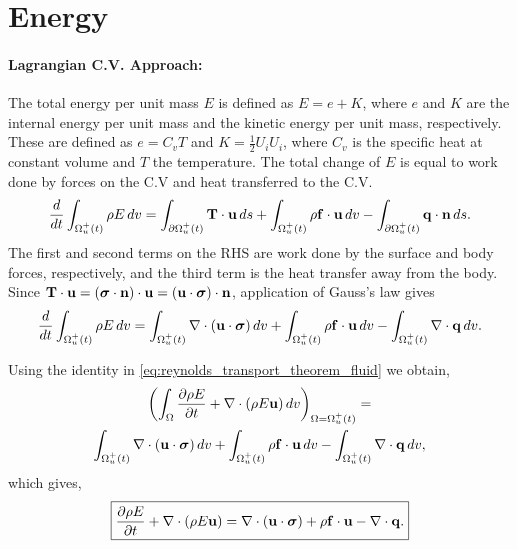 \documentclass[oneside,a4paper,11pt]{report}
\begin{document}
\section{Energy}

\paragraph{Lagrangian C.V. Approach:}
The total energy per unit mass $E$ is defined as $E = e + K$, where $e$ and $K$ are the internal energy per unit mass and the kinetic energy per unit mass, respectively. These are defined as $e = C_vT$ and $K = \frac{1}{2} U_i U_i$, where $C_v$ is the specific heat at constant volume and $T$ the temperature. The total change of $E$ is equal to work done by forces on the C.V and heat transferred to the C.V.
\begin{equation}
\frac{d}{dt}\int_{\Omega^+_u(t)} \rho E\,dv = \int_{\partial \Omega^+_u(t)} \mathbf{T} \cdot \mathbf{u} \,ds + \int_{\Omega^+_u(t)} \rho \mathbf{f} \cdot \mathbf{u} \,dv - \int_{\partial \Omega^+_u(t)} \mathbf{q} \cdot \mathbf{n} \, ds.
\end{equation}
The first and second terms on the RHS are work done by the surface and body forces, respectively, and the third term is the heat transfer away from the body. Since $\mathbf{T} \cdot \mathbf{u} = (\boldsymbol{\sigma} \cdot \mathbf{n}) \cdot \mathbf{u} = (\mathbf{u} \cdot \boldsymbol{\sigma}) \cdot \mathbf{n}$, application of Gauss's law gives
\begin{equation}
\frac{d}{dt}\int_{\Omega^+_u(t)} \rho E\,dv = \int_{\Omega^+_u(t)} \nabla \cdot (\mathbf{u} \cdot \boldsymbol{\sigma}) \,dv + \int_{\Omega^+_u(t)} \rho \mathbf{f} \cdot \mathbf{u} \,dv - \int_{\Omega^+_u(t)} \nabla \cdot \mathbf{q} \, dv.
\end{equation}

Using the identity in \cref{eq:reynolds_transport_theorem_fluid} we obtain,
\begin{multline}
\left(\int_{\Omega} \frac{\partial \rho E}{\partial t} +\nabla \cdot (\rho E \mathbf{u}) \,dv \right)_{\Omega = \Omega^+_u(t)} =\\ 
\int_{\Omega^+_u(t)}\nabla\cdot(\mathbf{u} \cdot \boldsymbol{\sigma} )\,dv
+ \int_{\Omega^+_u(t)} \rho \mathbf{f} \cdot \mathbf{u} \,dv
- \int_{\Omega^+_u(t)} \nabla\cdot\mathbf{q}\,dv,
\end{multline}
which gives,
\begin{equation}
    \boxed{\frac{\partial \rho E}{\partial t} +\nabla \cdot (\rho E \mathbf{u} ) = \nabla\cdot(\mathbf{u} \cdot \boldsymbol{\sigma} ) + \rho \mathbf{f} \cdot \mathbf{u} - \nabla \cdot \mathbf{q}.}
\end{equation}
\end{document}
